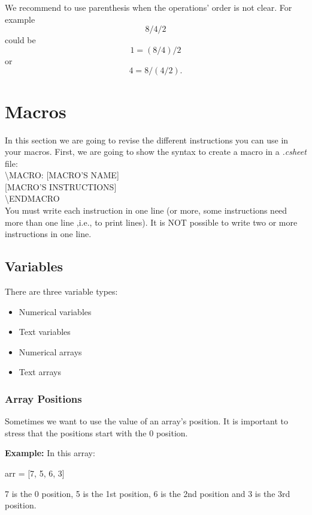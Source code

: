 \documentclass[11pt,a4paper,openright,oneside]{book}
\newenvironment{ex}
{
  \setlength{\parindent}{0cm}
  \large \textbf{Example:} \normalsize 
}
{}
\begin{document}
We recommend to use parenthesis when the operations' order is not clear. For example
$$8/4/2$$
could be
$$1 = (8/4)/2$$
or
$$4 = 8/(4/2).$$


\chapter{Macros}

In this section we are going to revise the different instructions you can use in your macros. First, we are going to show the syntax to create a \textsf{macro} in a \textit{.csheet} file:
\vspace{5px}\\
\textsf{\textbackslash MACRO: \textsc{\scriptsize[MACRO'S NAME]}} \\
\textsc{\scriptsize[MACRO'S INSTRUCTIONS]} \\
\textsf{\textbackslash ENDMACRO} \\

You must write each instruction in one line (or more, some instructions need more than one line ,i.e., \textsf{to print lines}). It is NOT possible to write two or more instructions in one line.

\section{Variables}

There are three variable types:
\begin{itemize}
  \item Numerical variables
  \item Text variables
  \item Numerical arrays
  \item Text arrays
\end{itemize}

\subsection{Array Positions}
Sometimes we want to use the value of an array's position. It is important to stress that the positions start with the 0 position.

\begin{ex} In this array:
  \begin{center} \textsf{arr = [7, 5, 6, 3]}\end{center}
  \textsf{7} is the 0 position, \textsf{5} is the 1st position, \textsf{6} is the 2nd position and \textsf{3} is the 3rd position.
\end{ex}
\end{document}
